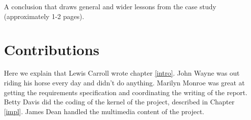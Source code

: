 \documentclass{l3proj}
\begin{document}
A conclusion that draws general and wider lessons from the case study (approximately 1-2 pages).

\section{Contributions}

Here we explain that Lewis Carroll wrote chapter \ref{intro}. John Wayne
was out riding his horse every day and didn't do anything. Marilyn Monroe
was great at getting the requirements specification and coordinating the
writing of the report. Betty Davis did the coding of the kernel of the
project, described in Chapter \ref{impl}.  James Dean handled the
multimedia content of the project.



\end{document}
